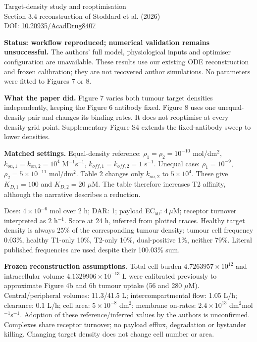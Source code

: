 \documentclass[10pt,a4paper]{article}
\begin{document}
\begin{center}{\Large Target-density study and reoptimisation}\\[3pt]
Section 3.4 reconstruction of Stoddard et al. (2026)\\
\small DOI: \href{https://doi.org/10.20935/AcadDrug8407}{10.20935/AcadDrug8407}\end{center}
\textbf{Status: workflow reproduced; numerical validation remains unsuccessful.}
The authors' full model, physiological inputs and optimiser configuration are unavailable. These results use our existing ODE reconstruction and frozen calibration; they are not recovered author simulations. No parameters were fitted to Figures 7 or 8.

\textbf{What the paper did.} Figure 7 varies both tumour target densities independently, keeping the Figure 6 antibody fixed. Figure 8 uses one unequal-density pair and changes its binding rates. It does not reoptimise at every density-grid point. Supplementary Figure S4 extends the fixed-antibody sweep to lower densities.

\textbf{Matched settings.} Equal-density reference: $\rho_1=\rho_2=10^{-10}$ mol/dm$^2$, $k_{on,1}=k_{on,2}=10^4$ M$^{-1}$s$^{-1}$, $k_{off,1}=k_{off,2}=1$ s$^{-1}$. Unequal case: $\rho_1=10^{-9}$, $\rho_2=5\times10^{-11}$ mol/dm$^2$. Table 2 changes only $k_{on,2}$ to $5\times10^4$. These give $K_{D,1}=100$ and $K_{D,2}=20$ $\mu$M. The table therefore increases T2 affinity, although the narrative describes a reduction.

Dose: $4\times10^{-6}$ mol over 2 h; DAR: 1; payload EC$_{50}$: $4\,\mu$M; receptor turnover interpreted as $2$ h$^{-1}$. Score at 24 h, inferred from plotted traces. Healthy target density is always 25\% of the corresponding tumour density; tumour cell frequency 0.03\%, healthy T1-only 10\%, T2-only 10\%, dual-positive 1\%, neither 79\%. Literal published frequencies are used despite their 100.03\% sum.

\textbf{Frozen reconstruction assumptions.} Total cell burden $4.7263957\times10^{12}$ and intracellular volume $4.1329906\times10^{-13}$ L were calibrated previously to approximate Figure 4b and 6b tumour uptake (56 and 280 $\mu$M). Central/peripheral volumes: 11.3/41.5 L; intercompartmental flow: 1.05 L/h; clearance: 0.1 L/h; cell area: $5\times10^{-8}$ dm$^2$; membrane on-rates: $2.4\times10^{13}$ dm$^2$mol$^{-1}$s$^{-1}$. Adoption of these reference/inferred values by the authors is unconfirmed. Complexes share receptor turnover; no payload efflux, degradation or bystander killing. Changing target density does not change cell number or area.
\end{document}
